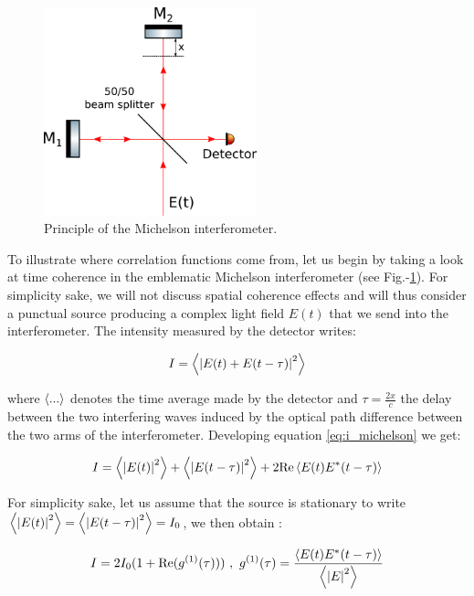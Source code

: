 \begin{figure}
    \centering
    \includegraphics[width=0.55\textwidth]{Fig/Chapter1/michelson.png}
    \caption{Principle of the Michelson interferometer.}
    \label{fig:michelson}
\end{figure}


To illustrate where correlation functions come from, let us begin by taking a look at time coherence in the emblematic Michelson interferometer (see Fig.-\ref{fig:michelson}). For simplicity sake, we will not discuss spatial coherence effects and will thus consider a punctual source producing a complex light field $E(t)$ that we send into the interferometer. The intensity measured by the detector writes:

\begin{equation}
    I=\left\langle\left\lvert E(t)+E(t-\tau)\right\rvert^2\right\rangle
    \label{eq:i_michelson}
\end{equation}

where $\left\langle...\right\rangle$ denotes the time average made by the detector and $\tau=\frac{2x}{c}$ the delay between the two interfering waves induced by the optical path difference between the two arms of the interferometer. Developing equation \ref{eq:i_michelson} we get:

\begin{equation}
    I=\left\langle\left\lvert E(t)\right\rvert^2\right\rangle + \left\langle\left\lvert E(t-\tau)\right\rvert^2\right\rangle + 2 {\rm{Re}} \left\langle E(t) E^*(t-\tau)\right\rangle
    \label{eq:def_g1}
\end{equation}

For simplicity sake, let us assume that the source is stationary to write $\left\langle\left\lvert E(t)\right\rvert^2\right\rangle = \left\langle\left\lvert E(t-\tau)\right\rvert^2\right\rangle = I_0$, we then obtain :

\begin{equation}
    I= 2 I_0 (1 + {\rm{Re}} (g^{(1)} (\tau))) \ , \ g^{(1)} (\tau) = \frac{ \left\langle E(t) E^*(t-\tau)\right\rangle}{\left\langle\left\lvert E\right\rvert^2\right\rangle}
\end{equation}

